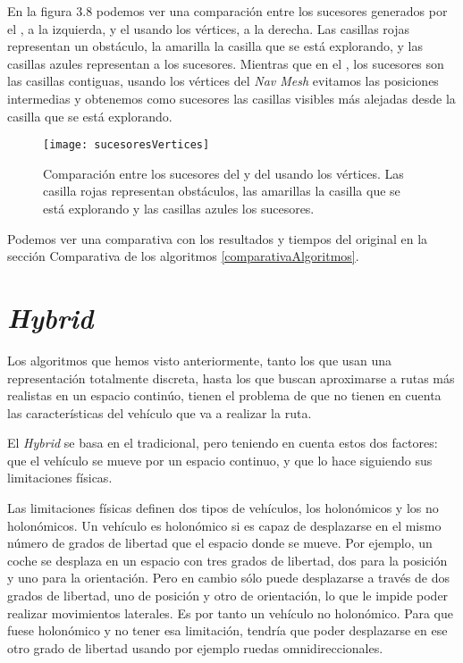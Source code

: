 En la figura 3.8 podemos ver una comparación entre los sucesores generados por el \Astar, a la izquierda, y el \Astar usando los vértices, a la derecha. Las casillas rojas representan un obstáculo, la amarilla la casilla que se está explorando, y las casillas azules representan a los sucesores. Mientras que en el \Astar, los sucesores son las casillas contiguas, usando los vértices del \textit{Nav Mesh} evitamos las posiciones intermedias y obtenemos como sucesores las casillas visibles más alejadas desde la casilla que se está explorando.
\begin{figure}[htpb]
    \centering
    \texttt{[image: sucesoresVertices]}
    \caption[Comparación entre los sucesores del \Astar y del \Astar usando los vértices]{Comparación entre los sucesores del \Astar y del \Astar usando los vértices. Las casilla rojas representan obstáculos, las amarillas la casilla que se está explorando y las casillas azules los sucesores.}
    \label{fig:basics AFM sketch}
\end{figure}

Podemos ver una comparativa con los resultados y tiempos del \Astar original en la sección Comparativa de los algoritmos \ref{comparativaAlgoritmos}.

\section{\textit{Hybrid \Astar}}
Los algoritmos que hemos visto anteriormente, tanto los que usan una representación totalmente discreta, hasta los que buscan aproximarse a rutas más realistas en un espacio continúo, tienen el problema de que no tienen en cuenta las características del vehículo que va a realizar la ruta.

El \textit{Hybrid \Astar}\cite{dolgov08gppISER,dolgov08gppSTAIR} se basa en el \Astar tradicional, pero teniendo en cuenta estos dos factores: que el vehículo se mueve por un espacio continuo, y que lo hace siguiendo sus limitaciones físicas.

Las limitaciones físicas definen dos tipos de vehículos, los holonómicos y los no holonómicos. Un vehículo es holonómico si es capaz de desplazarse en el mismo número de grados de libertad que el espacio donde se mueve. Por ejemplo, un coche se desplaza en un espacio con tres grados de libertad, dos para la posición y uno para la orientación. Pero en cambio sólo puede desplazarse a través de dos grados de libertad, uno de posición y otro de orientación, lo que le impide poder realizar movimientos laterales. Es por tanto un vehículo no holonómico. Para que fuese holonómico y no tener esa limitación, tendría que poder desplazarse en ese otro grado de libertad usando por ejemplo ruedas omnidireccionales.

